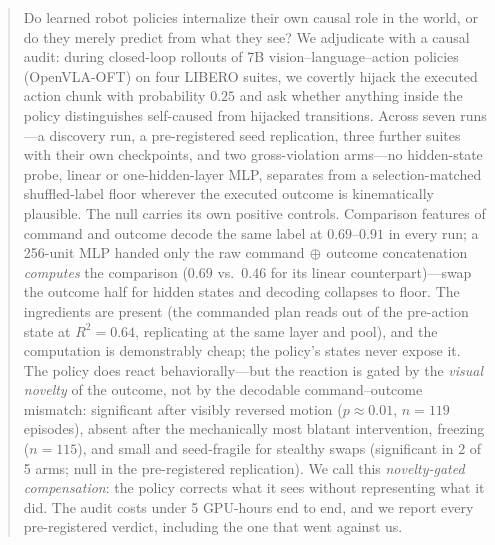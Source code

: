 \documentclass{article}
\begin{document}

\printAffiliationsAndNotice{}

\begin{abstract}
Do learned robot policies internalize their own causal role in the world, or
do they merely predict from what they see? We adjudicate with a causal
audit: during closed-loop rollouts of 7B vision--language--action policies
(OpenVLA-OFT) on four LIBERO suites, we covertly hijack the executed action
chunk with probability $0.25$ and ask whether anything inside the policy
distinguishes self-caused from hijacked transitions. Across seven runs---a
discovery run, a pre-registered seed replication, three further suites with
their own checkpoints, and two gross-violation arms---no hidden-state probe,
linear or one-hidden-layer MLP, separates from a selection-matched
shuffled-label floor wherever the executed outcome is kinematically
plausible. The null carries its own positive controls. Comparison features
of command and outcome decode the same label at $0.69$--$0.91$ in every run;
a 256-unit MLP handed only the raw command$\,\oplus\,$outcome concatenation
\emph{computes} the comparison ($0.69$ vs.\ $0.46$ for its linear
counterpart)---swap the outcome half for hidden states and decoding
collapses to floor. The ingredients are present (the commanded plan reads
out of the pre-action state at $R^2{=}0.64$, replicating at the same layer
and pool), and the computation is demonstrably cheap; the policy's states
never expose it. The policy does react behaviorally---but the reaction is
gated by the \emph{visual novelty} of the outcome, not by the decodable
command--outcome mismatch: significant after visibly reversed motion
($p{\approx}0.01$, $n{=}119$ episodes), absent after the mechanically most
blatant intervention, freezing ($n{=}115$), and small and seed-fragile for
stealthy swaps (significant in 2 of 5 arms; null in the pre-registered
replication). We call this \emph{novelty-gated compensation}: the policy
corrects what it sees without representing what it did. The audit costs
under 5 GPU-hours end to end, and we report every pre-registered verdict,
including the one that went against us.
\end{abstract}
\end{document}

